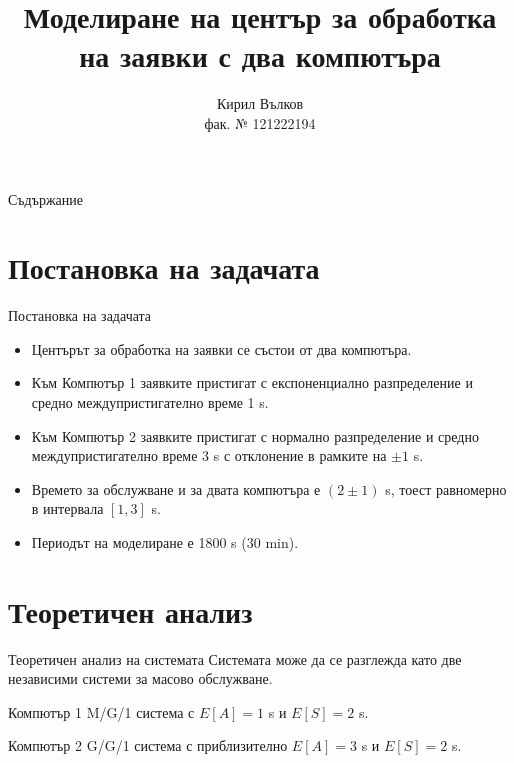 \documentclass[aspectratio=169]{beamer}
\title{Моделиране на център за обработка на заявки с два компютъра}
\author{Кирил Вълков \\ фак. № 121222194}
\institute{Технически университет -- София \\ Факултет „Компютърни системи и технологии“}
\date{}
\begin{document}
\begin{frame}
    \titlepage
\end{frame}

\begin{frame}{Съдържание}
    \tableofcontents
\end{frame}

\section{Постановка на задачата}

\begin{frame}{Постановка на задачата}
    \begin{itemize}
        \item Центърът за обработка на заявки се състои от два компютъра.
        \item Към Компютър 1 заявките пристигат с експоненциално разпределение и средно междупристигателно време 1 s.
        \item Към Компютър 2 заявките пристигат с нормално разпределение и средно междупристигателно време 3 s с отклонение в рамките на $\pm 1$ s.
        \item Времето за обслужване и за двата компютъра е $(2 \pm 1)$ s, тоест равномерно в интервала $[1,3]$ s.
        \item Периодът на моделиране е 1800 s (30 min).
    \end{itemize}
\end{frame}

\section{Теоретичен анализ}

\begin{frame}{Теоретичен анализ на системата}
    Системата може да се разглежда като две независими системи за масово обслужване.

    \vspace{0.5cm}

    \begin{block}{Компютър 1}
        M/G/1 система с $E[A]=1$ s и $E[S]=2$ s.
    \end{block}

    \begin{block}{Компютър 2}
        G/G/1 система с приблизително $E[A]=3$ s и $E[S]=2$ s.
    \end{block}
\end{frame}
\end{document}
